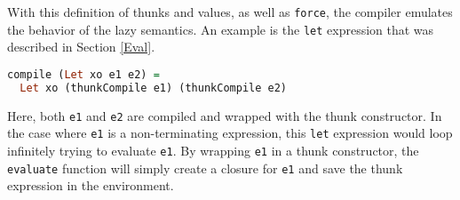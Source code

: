 With this definition of thunks and values, as well as \texttt{force}, the
compiler emulates the behavior of the lazy semantics. An example is the
\texttt{let} expression that was described in Section \ref{Eval}.

\begin{lstlisting}[language=haskell]
compile (Let xo e1 e2) =
  Let xo (thunkCompile e1) (thunkCompile e2)
\end{lstlisting}
Here, both \texttt{e1} and \texttt{e2} are compiled and wrapped with the thunk
constructor. In the case where \texttt{e1} is a non-terminating expression,
this \texttt{let} expression would loop infinitely trying to evaluate
\texttt{e1}. By wrapping \texttt{e1} in a thunk constructor, the
\texttt{evaluate} function will simply create a closure for \texttt{e1} and save
the thunk expression in the environment.
